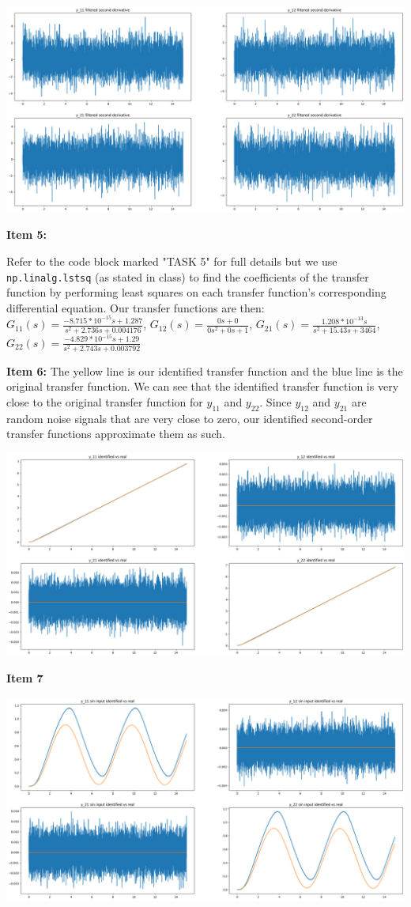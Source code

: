 \documentclass[11pt,legalpaper]{article}
\begin{document}
\includegraphics[width=450pt]{p2_3.png}

\textbf{Item 5:}

Refer to the code block marked "TASK 5" for full details but we use \texttt{np.linalg.lstsq} (as stated in class) to find the coefficients of the transfer function by performing least squares on each transfer function's corresponding differential equation. Our transfer functions are then: $G_{11}(s) = \frac{-8.715*10^{-15} s + 1.287}{s^2 + 2.736 s + 0.004176}$, $G_{12}(s) = \frac{0s + 0}{0s^2 + 0s + 1}$, $G_{21}(s) = \frac{1.208*10^{-13}s}{s^2 + 15.43 s + 3464}$, $G_{22}(s) = \frac{ -4.829*10^{-15}s + 1.29}{s^2 + 2.743 s + 0.003792}$

\textbf{Item 6:} The yellow line is our identified transfer function and the blue line is the original transfer function. We can see that the identified transfer function is very close to the original transfer function for $y_{11}$ and $y_{22}$. Since $y_{12}$ and $y_{21}$ are random noise signals that are very close to zero, our identified second-order transfer functions approximate them as such.

\includegraphics[width=450pt]{p2_4.png}

\textbf{Item 7}

\includegraphics[width=450pt]{p2_5.png}
\end{document}
